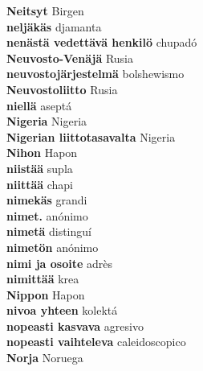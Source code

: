 \textbf{ Neitsyt  } Birgen \\
\textbf{ neljäkäs  } djamanta \\
\textbf{ nenästä vedettävä henkilö  } chupadó \\
\textbf{ Neuvosto-Venäjä  } Rusia \\
\textbf{ neuvostojärjestelmä  } bolshewismo \\
\textbf{ Neuvostoliitto  } Rusia \\
\textbf{ niellä  } aseptá \\
\textbf{ Nigeria  } Nigeria \\
\textbf{ Nigerian  liittotasavalta  } Nigeria \\
\textbf{ Nihon  } Hapon \\
\textbf{ niistää  } supla \\
\textbf{ niittää  } chapi \\
\textbf{ nimekäs  } grandi \\
\textbf{ nimet.  } anónimo \\
\textbf{ nimetä  } distinguí \\
\textbf{ nimetön  } anónimo \\
\textbf{ nimi ja osoite  } adrès \\
\textbf{ nimittää  } krea \\
\textbf{ Nippon  } Hapon \\
\textbf{ nivoa yhteen  } kolektá \\
\textbf{ nopeasti kasvava  } agresivo \\
\textbf{ nopeasti vaihteleva  } caleidoscopico \\
\textbf{ Norja  } Noruega \\
